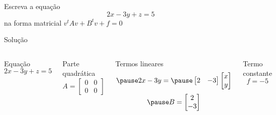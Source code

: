\begin{question}
  Escreva a equação
  \[
    2x - 3y + z = 5
  \]
  na forma matricial
  \(
    v^tAv + B^tv + f = 0
  \)
\end{question}

\begin{resolution}{Solução}
\begin{columns}[t]
  Equação
  \[
    2x - 3y + z = 5
  \]

  \pause
  Parte quadrática
  \[
    A = \begin{bmatrix}
      0 & 0 \\
      0 & 0
    \end{bmatrix}
  \]

  \pause
  Termos lineares
  \[
    \pause
    2x - 3y =
    \pause
    \begin{bmatrix} 2 & -3 \end{bmatrix}
    \begin{bmatrix} x \\ y \end{bmatrix}
  \]
  \[
    \pause
    B = \begin{bmatrix} 2 \\ -3 \end{bmatrix}
  \]

  \bigskip
  \pause
  Termo constante
  \[
    f = -5
  \]
\end{columns}
\end{resolution}

\endinput
